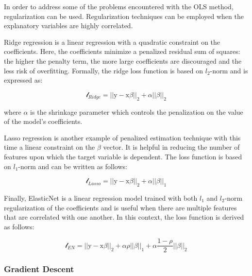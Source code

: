 \documentclass[
]{book}
\begin{document}
In order to address some of the problems encountered with the OLS method, regularization can be used. Regularization techniques can be employed when the explanatory variables are highly correlated.

Ridge regression is a linear regression with a quadratic constraint on the coefficients. Here, the coefficients minimize a penalized residual sum of squares: the higher the penalty term, the more large coefficients are discouraged and the less risk of overfitting. Formally, the ridge loss function is based on \(l_2\)-norm and is expressed as:

\begin{equation}
  \mathcal{l}_{Ridge} = ||\mathrm{y} - \pmb{\mathrm{x}}\beta||_2 + \alpha ||\beta||_2
  \label{eq:ridge}
\end{equation}

where \(\alpha\) is the shrinkage parameter which controls the penalization on the value of the model's coefficients.

Lasso regression is another example of penalized estimation technique with this time a linear constraint on the \(\beta\) vector. It is helpful in reducing the number of features upon which the target variable is dependent. The loss function is based on \(l_1\)-norm and can be written as follows:

\begin{equation}
  \mathcal{l}_{Lasso} = ||\mathrm{y} - \pmb{\mathrm{x}}\beta||_2 + \alpha ||\beta||_1
  \label{eq:lasso}
\end{equation}

Finally, ElasticNet is a linear regression model trained with both \(l_1\) and \(l_2\)-norm regularization of the coefficients and is useful when there are multiple features that are correlated with one another. In this context, the loss function is derived as follows:

\begin{equation}
  \mathcal{l}_{EN} = ||\mathrm{y} - \pmb{\mathrm{x}}\beta||_2 + \alpha \rho ||\beta||_1 + \alpha \frac{1-\rho}{2} ||\beta||_2
  \label{eq:elasticnet}
\end{equation}

\hypertarget{gradient-descent}{%
\subsubsection*{Gradient Descent}\label{gradient-descent}}
\end{document}
